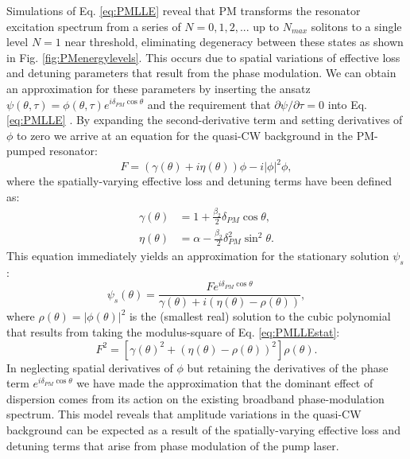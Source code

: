 Simulations of Eq. \ref{eq:PMLLE} reveal that PM transforms the resonator excitation spectrum from a series of $N=0, 1, 2,...$ up to $N_{max}$ solitons to a single level $N=1$ near threshold, eliminating degeneracy between these states as shown in Fig. \ref{fig:PMenergylevels}. This occurs due to spatial variations of effective loss and detuning parameters that result from the phase modulation. We can obtain an approximation for these parameters by inserting the ansatz $\psi(\theta,\tau)=\phi(\theta,\tau)e^{i\delta_{PM}\cos{\theta}}$ and the requirement that $\partial \psi/\partial \tau=0$ into Eq. \ref{eq:PMLLE} \cite{Jang2015a}.  By expanding the second-derivative term and setting derivatives of $\phi$ to zero we arrive at an equation for the quasi-CW background in the PM-pumped resonator:
\begin{equation}
F=\left(\gamma(\theta)+i\eta(\theta)\right)\phi-i|\phi|^2\phi, \label{eq:PMLLEstat}
\end{equation}
where the spatially-varying effective loss and detuning terms have been defined as:
\begin{align}
\gamma(\theta)&=1+\frac{\beta_2}{2}\delta_{PM}\cos{\theta},\\
\eta(\theta)&=\alpha-\frac{\beta_2}{2}\delta_{PM}^2\sin^2{\theta}.
\end{align}
This equation immediately yields an approximation for the stationary solution $\psi_s$:
\begin{equation}
\psi_s(\theta)=\frac{Fe^{i\delta_{PM}\cos{\theta}}}{\gamma(\theta)+i\left(\eta(\theta)-\rho(\theta)\right)},\label{eq:PMLLEstatpsi}
\end{equation}
where $\rho(\theta)=|\phi(\theta)|^2$ is the (smallest real) solution to the cubic polynomial that results from taking the modulus-square of Eq. \ref{eq:PMLLEstat}:
\begin{equation}
F^2=\left[\gamma(\theta)^2+\left(\eta(\theta)-\rho(\theta)\right)^2\right]\rho(\theta). \label{eq:PMLLEstat2}
\end{equation}
In neglecting spatial derivatives of $\phi$ but retaining the derivatives of the phase term $e^{i\delta_{PM}\cos{\theta}}$ we have made the approximation that the dominant effect of dispersion comes from its action on the existing broadband phase-modulation spectrum. This model reveals that amplitude variations in the quasi-CW background can be expected as a result of the spatially-varying effective loss and detuning terms that arise from phase modulation of the pump laser.

